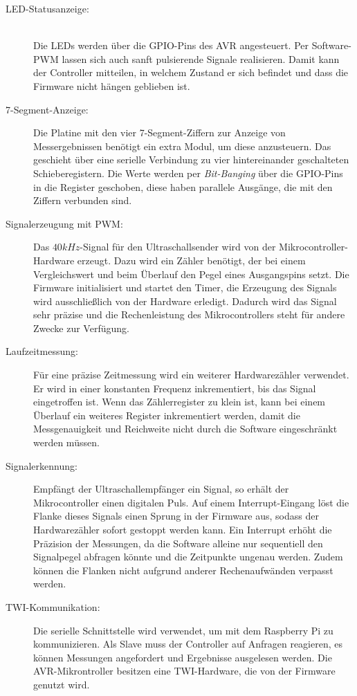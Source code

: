 \begin{description} %
	\item[LED-Statusanzeige:] \hfill \\Die LEDs werden über die \ac{GPIO}-Pins des AVR angesteuert. Per Software-\ac{PWM} lassen sich auch sanft pulsierende Signale realisieren. Damit kann der Controller mitteilen, in welchem Zustand er sich befindet und dass die Firmware nicht hängen geblieben ist.
	\item[7-Segment-Anzeige:] Die Platine mit den vier 7-Segment-Ziffern zur Anzeige von Messergebnissen benötigt ein extra Modul, um diese anzusteuern. Das geschieht über eine serielle Verbindung zu vier hintereinander geschalteten Schieberegistern. Die Werte werden per \textit{Bit-Banging} über die \ac{GPIO}-Pins in die Register geschoben, diese haben parallele Ausgänge, die mit den Ziffern verbunden sind.
	\item[Signalerzeugung mit \ac{PWM}:] Das $40kHz$-Signal für den Ultraschallsender wird von der Mikrocontroller-Hardware erzeugt. Dazu wird ein Zähler benötigt, der bei einem Vergleichswert und beim Überlauf den Pegel eines Ausgangspins setzt. Die Firmware initialisiert und startet den Timer, die Erzeugung des Signals wird ausschließlich von der Hardware erledigt. Dadurch wird das Signal sehr präzise und die Rechenleistung des Mikrocontrollers steht für andere Zwecke zur Verfügung.
	\item[Laufzeitmessung:] Für eine präzise Zeitmessung wird ein weiterer Hardwarezähler verwendet. Er wird in einer konstanten Frequenz inkrementiert, bis das Signal eingetroffen ist. Wenn das Zählerregister zu klein ist, kann bei einem Überlauf ein weiteres Register inkrementiert werden, damit die Messgenauigkeit und Reichweite nicht durch die Software eingeschränkt werden müssen.
	\item[Signalerkennung:] Empfängt der Ultraschallempfänger ein Signal, so erhält der Mikrocontroller einen digitalen Puls. Auf einem Interrupt-Eingang löst die Flanke dieses Signals einen Sprung in der Firmware aus, sodass der Hardwarezähler sofort gestoppt werden kann. Ein Interrupt erhöht die Präzision der Messungen, da die Software alleine nur sequentiell den Signalpegel abfragen könnte und die Zeitpunkte ungenau werden. Zudem können die Flanken nicht aufgrund anderer Rechenaufwänden verpasst werden.
	\item[\ac{TWI}-Kommunikation:] Die serielle Schnittstelle wird verwendet, um mit dem Raspberry Pi zu kommunizieren. Als Slave muss der Controller auf Anfragen reagieren, es können Messungen angefordert und Ergebnisse ausgelesen werden. Die AVR-Mikrontroller besitzen eine \ac{TWI}-Hardware, die von der Firmware genutzt wird.
\end{description}



